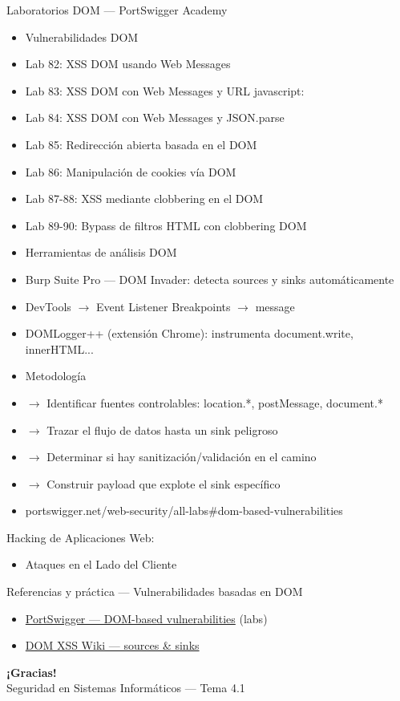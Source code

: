 \documentclass[aspectratio=169,10pt]{beamer}
\begin{document}
\begin{frame}[allowframebreaks]{Laboratorios DOM --- PortSwigger Academy}
\small
  \begin{itemize}
  \item Vulnerabilidades DOM
  \item Lab 82: XSS DOM usando Web Messages
  \item Lab 83: XSS DOM con Web Messages y URL javascript:
  \item Lab 84: XSS DOM con Web Messages y JSON.parse
  \item Lab 85: Redirección abierta basada en el DOM
  \item Lab 86: Manipulación de cookies vía DOM
  \item Lab 87-88: XSS mediante clobbering en el DOM
  \item Lab 89-90: Bypass de filtros HTML con clobbering DOM
  \item Herramientas de análisis DOM
  \item Burp Suite Pro --- DOM Invader: detecta sources y sinks automáticamente
  \item DevTools $\rightarrow$ Event Listener Breakpoints $\rightarrow$ message
  \item DOMLogger++ (extensión Chrome): instrumenta document.write, innerHTML...
  \item Metodología
  \item $\rightarrow$ Identificar fuentes controlables: location.*, postMessage, document.*
  \item $\rightarrow$ Trazar el flujo de datos hasta un sink peligroso
  \item $\rightarrow$ Determinar si hay sanitización/validación en el camino
  \item $\rightarrow$ Construir payload que explote el sink específico
  \item portswigger.net/web-security/all-labs\#dom-based-vulnerabilities
  \end{itemize}
\end{frame}

\begin{frame}[allowframebreaks]{Hacking de Aplicaciones Web:}
\small
  \begin{itemize}
  \item Ataques en el Lado del Cliente
  \end{itemize}
\end{frame}

\begin{frame}{Referencias y práctica --- Vulnerabilidades basadas en DOM}
\footnotesize
  \begin{itemize}
  \item \href{https://portswigger.net/web-security/dom-based}{PortSwigger --- DOM-based vulnerabilities} (labs)
  \item \href{https://github.com/wisec/domxsswiki/wiki}{DOM XSS Wiki --- sources \& sinks}
  \end{itemize}
\end{frame}

\begin{frame}[plain]
  \begin{center}
    {\Huge\bfseries\color{uznavy} ¡Gracias!}\\[1em]
    {\large Seguridad en Sistemas Informáticos --- Tema 4.1}
  \end{center}
\end{frame}

\end{document}
